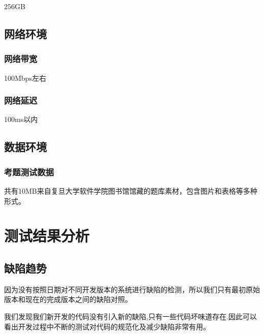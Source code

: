 \documentclass[hyperref, a4paper]{ctexart}
\begin{document}
256GB

\hypertarget{ux7f51ux7edcux73afux5883}{%
\subsection{网络环境}\label{ux7f51ux7edcux73afux5883}}

\hypertarget{ux7f51ux7edcux5e26ux5bbd}{%
\subsubsection{网络带宽}\label{ux7f51ux7edcux5e26ux5bbd}}

100Mbps左右

\hypertarget{ux7f51ux7edcux5ef6ux8fdf}{%
\subsubsection{网络延迟}\label{ux7f51ux7edcux5ef6ux8fdf}}

100ms以内

\hypertarget{ux6570ux636eux73afux5883}{%
\subsection{数据环境}\label{ux6570ux636eux73afux5883}}

\hypertarget{ux8003ux9898ux6d4bux8bd5ux6570ux636e}{%
\subsubsection{考题测试数据}\label{ux8003ux9898ux6d4bux8bd5ux6570ux636e}}

共有10MB来自复旦大学软件学院图书馆馆藏的题库素材，包含图片和表格等多种形式。

\hypertarget{ux6d4bux8bd5ux7ed3ux679cux5206ux6790}{%
\section{测试结果分析}\label{ux6d4bux8bd5ux7ed3ux679cux5206ux6790}}

\hypertarget{ux7f3aux9677ux8d8bux52bf}{%
\subsection{缺陷趋势}\label{ux7f3aux9677ux8d8bux52bf}}

因为没有按照日期对不同开发版本的系统进行缺陷的检测，所以我们只有最初原始版本和现在的完成版本之间的缺陷对照。

我们发现我们新开发的代码没有引入新的缺陷,只有一些代码坏味道存在.因此可以看出开发过程中不断的测试对代码的规范化及减少缺陷非常有用。
\end{document}
